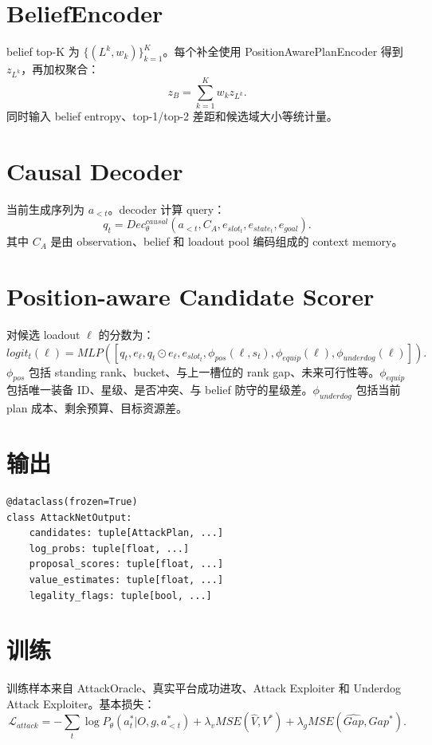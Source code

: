 \documentclass[UTF8,12pt,openany]{ctexbook}
\begin{document}
\section{BeliefEncoder}
belief top-K 为 $\{(L^k,w_k)\}_{k=1}^{K}$。每个补全使用 PositionAwarePlanEncoder 得到 $z_{L^k}$，再加权聚合：
\begin{equation}
z_B=\sum_{k=1}^{K}w_k z_{L^k}.
\end{equation}
同时输入 belief entropy、top-1/top-2 差距和候选域大小等统计量。

\section{Causal Decoder}
当前生成序列为 $a_{<t}$。decoder 计算 query：
\begin{equation}
q_t=Dec^{causal}_\theta(a_{<t}, C_A, e_{slot_t}, e_{state_t}, e_{goal}).
\end{equation}
其中 $C_A$ 是由 observation、belief 和 loadout pool 编码组成的 context memory。

\section{Position-aware Candidate Scorer}
对候选 loadout $\ell$ 的分数为：
\begin{equation}
logit_t(\ell)=MLP([q_t,e_\ell,q_t\odot e_\ell,e_{slot_t},\phi_{pos}(\ell,s_t),\phi_{equip}(\ell),\phi_{underdog}(\ell)]).
\end{equation}
$\phi_{pos}$ 包括 standing rank、bucket、与上一槽位的 rank gap、未来可行性等。$\phi_{equip}$ 包括唯一装备 ID、星级、是否冲突、与 belief 防守的星级差。$\phi_{underdog}$ 包括当前 plan 成本、剩余预算、目标资源差。

\section{输出}
\begin{lstlisting}[caption={AttackNetOutput}]
@dataclass(frozen=True)
class AttackNetOutput:
    candidates: tuple[AttackPlan, ...]
    log_probs: tuple[float, ...]
    proposal_scores: tuple[float, ...]
    value_estimates: tuple[float, ...]
    legality_flags: tuple[bool, ...]
\end{lstlisting}

\section{训练}
训练样本来自 AttackOracle、真实平台成功进攻、Attack Exploiter 和 Underdog Attack Exploiter。基本损失：
\begin{equation}
\mathcal{L}_{attack}= -\sum_t\log P_\theta(a_t^*|O,g,a_{<t}^*)+\lambda_vMSE(\hat V,V^*)+\lambda_gMSE(\widehat{Gap},Gap^*).
\end{equation}
\end{document}
